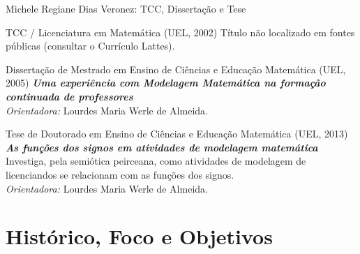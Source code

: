 \documentclass[10pt, aspectratio=169]{beamer}
\begin{document}
\begin{frame}{Michele Regiane Dias Veronez: TCC, Dissertação e Tese}
    \transwipe[direction=90, duration=0.4]
    \footnotesize
    \begin{block}{TCC / Licenciatura em Matemática (UEL, 2002)}
        Título não localizado em fontes públicas (consultar o Currículo Lattes).
    \end{block}
    \pause
    \begin{exampleblock}{Dissertação de Mestrado em Ensino de Ciências e Educação Matemática (UEL, 2005)}
        \textbf{\emph{Uma experiência com Modelagem Matemática na formação continuada de professores}} \\
        \emph{Orientadora:} Lourdes Maria Werle de Almeida.
    \end{exampleblock}
    \pause
    \begin{alertblock}{Tese de Doutorado em Ensino de Ciências e Educação Matemática (UEL, 2013)}
        \textbf{\emph{As funções dos signos em atividades de modelagem matemática}} \\
        Investiga, pela semiótica peirceana, como atividades de modelagem de licenciandos se relacionam com as funções dos signos. \\
        \emph{Orientadora:} Lourdes Maria Werle de Almeida.
    \end{alertblock}
\end{frame}

\section{Histórico, Foco e Objetivos}
\end{document}
